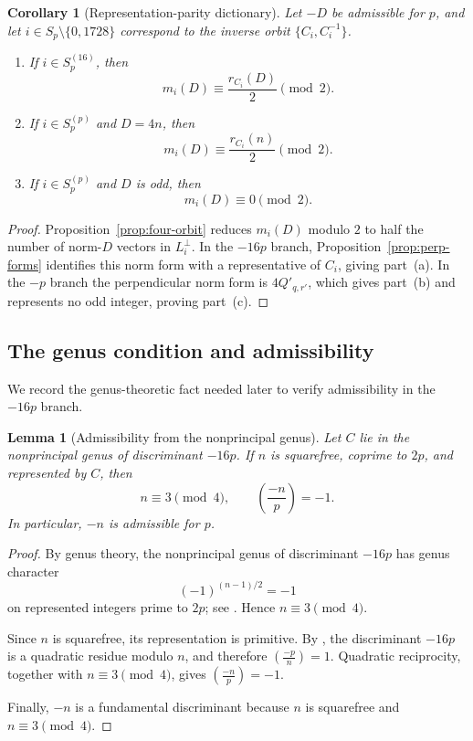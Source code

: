 \documentclass[11pt]{amsart}
\newtheorem{lemma}[theorem]{Lemma}
\newtheorem{corollary}[theorem]{Corollary}
\theoremstyle{definition}
\theoremstyle{remark}
\newcommand{\leg}[2]{\left(\frac{#1}{#2}\right)}
\begin{document}
\begin{corollary}[Representation-parity dictionary]
\label{cor:dictionary}
Let $-D$ be admissible for $p$, and let
$i\in S_p\setminus\{0,1728\}$ correspond to the inverse orbit
$\{C_i,C_i^{-1}\}$.
\begin{enumerate}[label=\textup{(\alph*)}]
\item If $i\in S_p^{(16)}$, then
\[
  m_i(D)\equiv\frac{r_{C_i}(D)}2\pmod2.
\]

\item If $i\in S_p^{(p)}$ and $D=4n$, then
\[
  m_i(D)\equiv\frac{r_{C_i}(n)}2\pmod2.
\]

\item If $i\in S_p^{(p)}$ and $D$ is odd, then
\[
  m_i(D)\equiv0\pmod2.
\]
\end{enumerate}
\end{corollary}

\begin{proof}
Proposition~\ref{prop:four-orbit} reduces $m_i(D)$ modulo $2$ to half
the number of norm-$D$ vectors in $L_i^\perp$. In the $-16p$ branch,
Proposition~\ref{prop:perp-forms} identifies this norm form with a
representative of $C_i$, giving part~\textup{(a)}. In the $-p$ branch
the perpendicular norm form is $4Q'_{q,r'}$, which gives
part~\textup{(b)} and represents no odd integer, proving
part~\textup{(c)}.
\end{proof}


\subsection{The genus condition and admissibility}

We record the genus-theoretic fact needed later to verify admissibility in
the $-16p$ branch.

\begin{lemma}[Admissibility from the nonprincipal genus]
\label{lem:odd-genus}
Let $C$ lie in the nonprincipal genus of discriminant $-16p$. If $n$ is
squarefree, coprime to $2p$, and represented by $C$, then
\[
  n\equiv3\pmod4,
  \qquad
  \leg{-n}{p}=-1.
\]
In particular, $-n$ is admissible for $p$.
\end{lemma}

\begin{proof}
By genus theory, the nonprincipal genus of discriminant $-16p$ has genus
character
\[
  (-1)^{(n-1)/2}=-1
\]
on represented integers prime to $2p$; see
\cite[Theorem~3.15]{Cox2013}. Hence $n\equiv3\pmod4$.

Since $n$ is squarefree, its representation is primitive. By
\cite[Lemma~2.5]{Cox2013}, the discriminant $-16p$ is a quadratic residue
modulo $n$, and therefore
$\leg{-p}{n}=1$.
Quadratic reciprocity, together with $n\equiv3\pmod4$, gives
$\leg{-n}{p}=-1$.

Finally, $-n$ is a fundamental discriminant because $n$ is squarefree and
$n\equiv3\pmod4$.
\end{proof}
\end{document}
